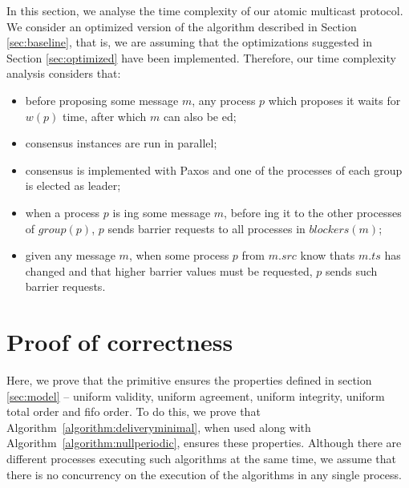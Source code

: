 \documentclass[times, 10pt]{article}
\begin{document}
In this section, we analyse the time complexity of our atomic multicast protocol. We consider an optimized version of the algorithm described in Section \ref{sec:baseline}, that is, we are assuming that the optimizations suggested in Section \ref{sec:optimized} have been implemented. Therefore, our time complexity analysis considers that:

\begin{itemize}
  \item before proposing some message $m$, any process $p$ which proposes it waits for $w(p)$ time, after which $m$ can also be \optdel{}ed;
  \item consensus instances are run in parallel;
  \item consensus is implemented with Paxos and one of the processes of each group is elected as leader;
  \item when a process $p$ is \amcast{}ing some message $m$, before \rmcast{}ing it to the other processes of $group(p)$, $p$ sends barrier requests to all processes in $blockers(m)$;
  \item given any message $m$, when some process $p$ from $m.src$ know thats $m.ts$ has changed and that higher barrier values must be requested, $p$ sends such barrier requests.
\end{itemize}






\section{Proof of correctness}
\label{sec:proofs}

Here, we prove that the \amcast{} primitive ensures the properties defined in section \ref{sec:model} -- uniform validity, uniform agreement, uniform integrity, uniform total order and fifo order. To do this, we prove that \mbox{Algorithm \ref{algorithm:deliveryminimal}}, when used along with \mbox{Algorithm \ref{algorithm:nullperiodic}}, ensures these properties. Although there are different processes executing such algorithms at the same time, we assume that there is no concurrency on the execution of the algorithms in any single process.
\end{document}
